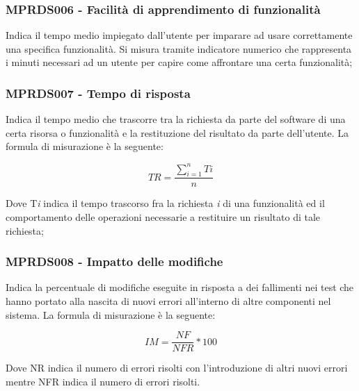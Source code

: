 {\subsubsection{MPRDS006 - Facilità di apprendimento di funzionalità}
Indica il tempo medio impiegato dall'utente per imparare ad usare correttamente una specifica funzionalità. Si misura tramite indicatore numerico che rappresenta i minuti necessari ad un utente per capire come affrontare una certa funzionalità;
\subsubsection{MPRDS007 - Tempo di risposta}
Indica il tempo medio che trascorre tra la richiesta da parte del software di una certa risorsa o funzionalità e la restituzione del risultato da parte dell'utente. La formula di misurazione è la seguente:
\begin{center}
    \begin{displaymath}
        TR = \frac{\sum\limits_{i=1}^n Ti}{n}
    \end{displaymath}
\end{center}
Dove T\textit{i} indica il tempo trascorso fra la richiesta \textit{i} di una funzionalità ed il comportamento delle operazioni necessarie a restituire un risultato di tale richiesta;
\subsubsection{MPRDS008 - Impatto delle modifiche}
Indica la percentuale di modifiche eseguite in risposta a dei fallimenti nei test che hanno portato alla nascita di nuovi errori all'interno di altre componenti nel sistema. La formula di misurazione è la seguente:
\begin{center}
    \begin{displaymath}
        IM = \frac{NF}{NFR} * 100
    \end{displaymath}
\end{center}
Dove NR indica il numero di errori risolti con l'introduzione di altri nuovi errori mentre NFR indica il numero di errori risolti.
}
